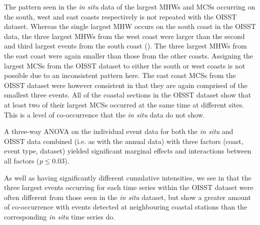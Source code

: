 \documentclass[a4paper,10pt,review]{elsarticle}
\begin{document}
The pattern seen in the \emph{in situ} data of the largest MHWs and MCSs occurring on the south, west and east coasts respectively is not repeated with the OISST dataset. Whereas the single largest MHW occurs on the south coast in the OISST data, the three largest MHWs from the west coast were larger than the second and third largest events from the south coast (). The three largest MHWs from the east coast were again smaller than those from the other coasts. Assigning the largest MCSs from the OISST dataset to either the south or west coasts is not possible due to an inconsistent pattern here. The east coast MCSs from the OISST dataset were however consistent in that they are again comprised of the smallest three events. All of the coastal sections in the OISST dataset show that at least two of their largest MCSs occurred at the same time at different sites. This is a level of co-occurrence that the \emph{in situ} data do not show.

A three-way ANOVA  on the individual event data for both the \emph{in situ} and OISST data combined (i.e. as with the annual data) with three factors (coast, event type, dataset) yielded significant marginal effects and interactions between all factors (\emph{p}$\leq$0.03).

As well as having significantly different cumulative intensities, we see in  that the three largest events occurring for each time series within the OISST dataset were often different from those seen in the \emph{in situ} dataset, but show a greater amount of co-occurrence with events detected at neighbouring coastal stations than the corresponding \emph{in situ} time series do.
\end{document}
